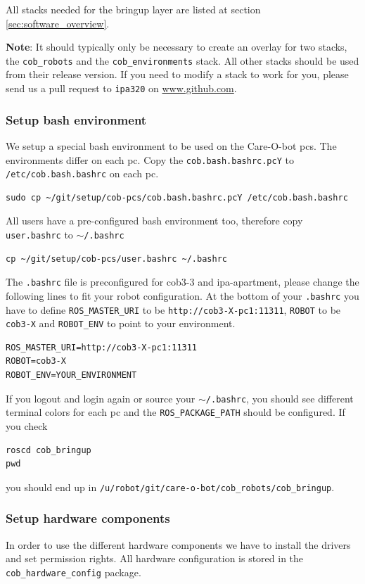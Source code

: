 All stacks needed for the bringup layer are listed at section \ref{sec:software_overview}. 

\textbf{Note}: It should typically only be necessary to create an overlay for two stacks, the \texttt{cob\_robots} and the \texttt{cob\_environments} stack. All other stacks should be used from their release version. If you need to modify a stack to work for you, please send us a pull request to \texttt{ipa320} on \url{www.github.com}.

\subsubsection{Setup bash environment}
We setup a special bash environment to be used on the Care-O-bot pcs. The environments differ on each pc. Copy the \texttt{cob.bash.bashrc.pcY} to \texttt{/etc/cob.bash.bashrc} on each pc.

\begin{lstlisting}
sudo cp ~/git/setup/cob-pcs/cob.bash.bashrc.pcY /etc/cob.bash.bashrc
\end{lstlisting}

All users have a pre-configured bash environment too, therefore copy \texttt{user.bashrc} to \texttt{$\sim$/.bashrc}
\begin{lstlisting}
cp ~/git/setup/cob-pcs/user.bashrc ~/.bashrc
\end{lstlisting}
The \texttt{.bashrc} file is preconfigured for cob3-3 and ipa-apartment, please change the following lines to fit your robot configuration. At the bottom of your \texttt{.bashrc} you have to define \texttt{ROS\_MASTER\_URI} to be \texttt{http://cob3-X-pc1:11311}, \texttt{ROBOT} to be \texttt{cob3-X} and \texttt{ROBOT\_ENV} to point to your environment.
\begin{lstlisting}
ROS_MASTER_URI=http://cob3-X-pc1:11311
ROBOT=cob3-X
ROBOT_ENV=YOUR_ENVIRONMENT
\end{lstlisting}

If you logout and login again or source your \texttt{$\sim$/.bashrc}, you should see different terminal colors for each pc and the \texttt{ROS\_PACKAGE\_PATH} should be configured. If you check 
\begin{lstlisting}
roscd cob_bringup
pwd
\end{lstlisting}
you should end up in \texttt{/u/robot/git/care-o-bot/cob\_robots/cob\_bringup}.

\subsubsection{Setup hardware components}
In order to use the different hardware components we have to install the drivers and set permission rights. All hardware configuration is stored in the \texttt{cob\_hardware\_config} package.

